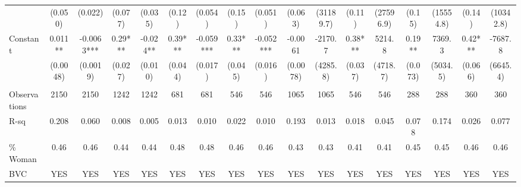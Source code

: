 \begin{tabular}{lcccccccccccccccc}
      & (0.050) & (0.022) & (0.077) & (0.035) & (0.12) & (0.054) & (0.15) & (0.051) & (0.063) & (31189.7) & (0.11) & (27596.9) & (0.15) & (15554.8) & (0.14) & (10342.8) \\
Constant  & 0.011** & -0.0063*** & 0.29*** & -0.024** & 0.39*** & -0.059*** & 0.33*** & -0.052*** & -0.0061 & -2170.7 & 0.38*** & 5214.8 & 0.19** & 7369.3 & 0.42*** & -7687.8 \\
      & (0.0048) & (0.0019) & (0.027) & (0.010) & (0.044) & (0.017) & (0.045) & (0.016) & (0.0078) & (4285.8) & (0.037) & (4718.7) & (0.073) & (5034.5) & (0.066) & (6645.4) \\
      &       &       &       &       &       &       &       &       &       &       &       &       &       &       &       &  \\
\midrule
Observations & 2150  & 2150  & 1242  & 1242  & 681   & 681   & 546   & 546   & 1065  & 1065  & 546   & 546   & 288   & 288   & 360   & 360 \\
R-sq  & 0.208 & 0.060 & 0.008 & 0.005 & 0.013 & 0.010 & 0.022 & 0.010 & 0.193 & 0.013 & 0.018 & 0.045 & 0.078 & 0.174 & 0.026 & 0.077 \\
\% Woman & 0.46  & 0.46  & 0.44  & 0.44  & 0.48  & 0.48  & 0.46  & 0.46  & 0.43  & 0.43  & 0.41  & 0.41  & 0.45  & 0.45  & 0.46  & 0.46 \\
BVC   & YES   & YES   & YES   & YES   & YES   & YES   & YES   & YES   & YES   & YES   & YES   & YES   & YES   & YES   & YES   & YES \\
\bottomrule
\bottomrule
\end{tabular}%
